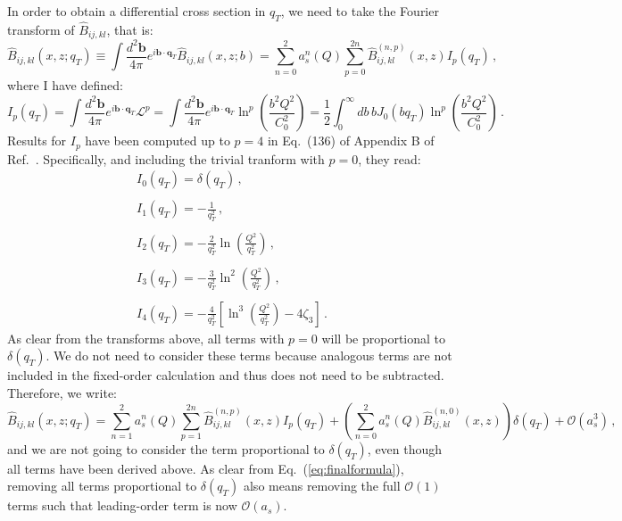 \documentclass[10pt,a4paper]{article}
\begin{document}
In order to obtain a differential cross section in $q_T$, we need to
take the Fourier transform of $\hat{B}_{ij,kl}$, that is:
\begin{equation}
 \hat{B}_{ij,kl}(x,z;q_T) \equiv \int\frac{d^2\mathbf{b}}{4\pi} e^{i \mathbf{b}\cdot
  \mathbf{q}_T} \hat{B}_{ij,kl}(x,z;b) = \sum_{n=0}^2a_s^n(Q)\sum_{p=0}^{2n}\hat{B}_{ij,kl}^{(n,p)}(x,z) I_p(q_T)\,,
\end{equation}
where I have defined:
\begin{equation}
I_p(q_T) = \int\frac{d^2\mathbf{b}}{4\pi} e^{i \mathbf{b}\cdot
  \mathbf{q}_T}\mathcal{L}^p=\int\frac{d^2\mathbf{b}}{4\pi} e^{i \mathbf{b}\cdot
  \mathbf{q}_T}\ln^p\left(\frac{b^2Q^2}{C_0^2}\right) = \frac12\int_0^\infty db\,b J_0(bq_T) \ln^p\left(\frac{b^2Q^2}{C_0^2}\right)\,.
\end{equation}
Results for $I_p$ have been computed up to $p=4$ in Eq.~(136) of
Appendix B of Ref.~\cite{Bozzi:2005wk}. Specifically, and including
the trivial tranform with $p=0$, they read:
\begin{equation}
\begin{array}{l}
\displaystyle I_0(q_T) = \delta(q_T)\,,\\
\\
\displaystyle I_1(q_T) = - \frac{1}{q_T^2}\,,\\
\\
\displaystyle I_2(q_T) = - \frac{2}{q_T^2}\ln\left(\frac{Q^2}{q_T^2}\right) \,,\\
\\
\displaystyle I_3(q_T) = - \frac{3}{q_T^2}\ln^2\left(\frac{Q^2}{q_T^2}\right) \,,\\
\\
\displaystyle I_4(q_T) = - \frac{4}{q_T^2}\left[\ln^3\left(\frac{Q^2}{q_T^2}\right)-4\zeta_3\right]\,.
\end{array}
\end{equation}
As clear from the transforms above, all terms with $p=0$ will be
proportional to $\delta(q_T)$. We do not need to consider these terms
because analogous terms are not included in the fixed-order
calculation and thus does not need to be subtracted. Therefore, we write:
\begin{equation}\label{eq:finalformula}
  \hat{B}_{ij,kl}(x,z;q_T) =
  \sum_{n=1}^2a_s^n(Q)\sum_{p=1}^{2n}\hat{B}_{ij,kl}^{(n,p)}(x,z)
  I_p(q_T)+ \left(\sum_{n=0}^2a_s^n(Q)\hat{B}_{ij,kl}^{(n,0)}(x,z)\right)\delta(q_T)+\mathcal{O}(a_s^3)\,,
\end{equation}
and we are not going to consider the term proportional to
$\delta(q_T)$, even though all terms have been derived above. As clear
from Eq.~(\ref{eq:finalformula}), removing all terms proportional to
$\delta(q_T)$ also means removing the full $\mathcal{O}(1)$ terms such
that leading-order term is now $\mathcal{O}(a_s)$.
\end{document}
